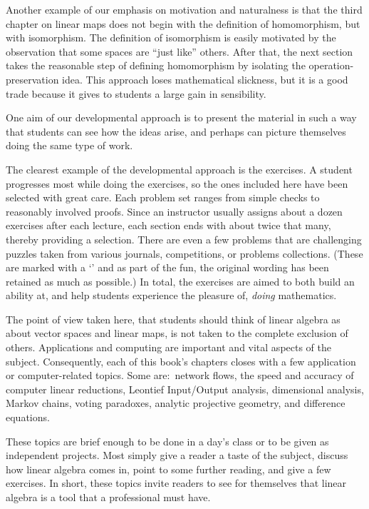 Another example of our emphasis on motivation and naturalness
is that the third chapter on linear maps
does not begin with the definition of homomorphism, 
but with isomorphism.
The definition of isomorphism is easily motivated
by the observation that some spaces are ``just like'' others.
After that,
the next section takes the reasonable step of defining homomorphism by
isolating the operation-preservation idea.
This approach loses mathematical slickness, 
but it is a good trade because it gives to students
a large gain in sensibility.

One aim of our developmental approach is 
to present the material in such a way that students 
can see how the ideas arise, and perhaps can picture themselves
doing the same type of work.

The clearest example of the developmental approach is the
exercises.
A student progresses most while doing the exercises, so the ones
included here have
been selected with great care.
Each problem set ranges from
simple checks to reasonably involved proofs.
Since an instructor usually assigns about a dozen exercises
after each lecture,
each section ends with about twice that many, 
thereby providing a selection.
There are even a few problems that are challenging puzzles
taken from various journals, competitions, or
problems collections. 
(These are marked with a
`\puzzlemark' and 
as part of the fun, the original wording
has been retained as much as possible.)
In total, the exercises are aimed to both build an ability at,
and help students experience the pleasure of, 
\emph{doing} mathematics.


\medskip
{}
The point of view taken here, that students should think of 
linear algebra as about vector spaces
and linear maps, is not taken to the complete exclusion of others.
Applications and computing are important and vital aspects 
of the subject.
Consequently, each of this book's chapters closes with a few 
application or computer-related topics.
Some are:~network flows, the speed and accuracy of
computer linear reductions, Leontief Input/Output analysis,
dimensional analysis, Markov chains, voting paradoxes,
analytic projective geometry, and difference equations.

These topics are brief enough to be done in a day's class 
or to be given as independent projects.
Most simply give a reader
a taste of the subject, discuss how linear algebra comes in,
point to some further reading, and give a few exercises. 
In short, these topics invite 
readers to see for themselves that linear algebra is a tool
that a professional must have. 




